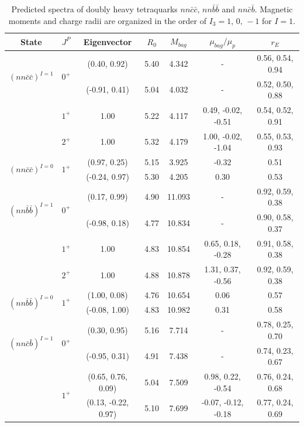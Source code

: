 \documentclass[12pt,onecolumn,floatfix,nofootinbib]{revtex4}
\begin{document}
\renewcommand{\tabcolsep}{0.40cm} \renewcommand{\arraystretch}{1.2}
\begin{table}[!htb]
\caption{Predicted spectra of doubly heavy tetraquarks $nn\bar{c}\bar{c}$, $%
nn\bar{b}\bar{b}$ and $nn\bar{c}\bar{b}$. Magnetic moments and charge radii 
are organized in the order of $%
I_{3}=1,\,0,\,-1$ for $I=1$.}
\label{tab:2heavytetraquark1}%
\begin{tabular}{ccccccc}
\hline\hline
\textrm{State} & $J^{P}$ & \textrm{Eigenvector} & $R_{0}$ & $M_{bag}$ & $%
\mu_{bag}/\mu_{p}$ & $r_{E}$ \\ \hline
\multirow{2}{*}{${(nn\bar{c}\bar{c})}^{I=1}$} & \multirow{2}{*}{$0^{+}$} &
(0.40, 0.92) & 5.40 & 4.342 & - & 0.56, 0.54, 0.94 \\
&  & (-0.91, 0.41) & 5.04 & 4.032 & - & 0.52, 0.50, 0.88 \\
& $1^{+}$ & 1.00 & 5.22 & 4.117 & 0.49, -0.02, -0.51 & 0.54, 0.52, 0.91 \\
& $2^{+}$ & 1.00 & 5.32 & 4.179 & 1.00, -0.02, -1.04 & 0.55, 0.53, 0.93 \\
\multirow{2}{*}{${(nn\bar{c}\bar{c})}^{I=0}$} & \multirow{2}{*}{$1^{+}$} &
(0.97, 0.25) & 5.15 & 3.925 & -0.32 & 0.51 \\
&  & (-0.24, 0.97) & 5.30 & 4.205 & 0.30 & 0.53 \\
\multirow{2}{*}{${(nn\bar{b}\bar{b})}^{I=1}$} & \multirow{2}{*}{$0^{+}$} &
(0.17, 0.99) & 4.90 & 11.093 & - & 0.92, 0.59, 0.38 \\
&  & (-0.98, 0.18) & 4.77 & 10.834 & - & 0.90, 0.58, 0.37 \\
& $1^{+}$ & 1.00 & 4.83 & 10.854 & 0.65, 0.18, -0.28 & 0.91, 0.58, 0.38 \\
& $2^{+}$ & 1.00 & 4.88 & 10.878 & 1.31, 0.37, -0.56 & 0.92, 0.59, 0.38 \\
\multirow{2}{*}{${(nn\bar{b}\bar{b})}^{I=0}$} & \multirow{2}{*}{$1^{+}$} &
(1.00, 0.08) & 4.76 & 10.654 & 0.06 & 0.57 \\
&  & (-0.08, 1.00) & 4.83 & 10.982 & 0.31 & 0.58 \\
\multirow{2}{*}{${(nn\bar{c}\bar{b})}^{I=1}$} & \multirow{2}{*}{$0^{+}$} &
(0.30, 0.95) & 5.16 & 7.714 & - & 0.78, 0.25, 0.70 \\
&  & (-0.95, 0.31) & 4.91 & 7.438 & - & 0.74, 0.23, 0.67 \\
& \multirow{3}{*}{$1^{+}$} & (0.65, 0.76, 0.09) & 5.04 & 7.509
& 0.98, 0.22, -0.54 & 0.76, 0.24, 0.68 \\
&  & (0.13, -0.22, 0.97) & 5.10 & 7.699 & -0.07, -0.12, -0.18 & 0.77, 0.24, 0.69 \\

\end{tabular}
\end{table}
\end{document}
